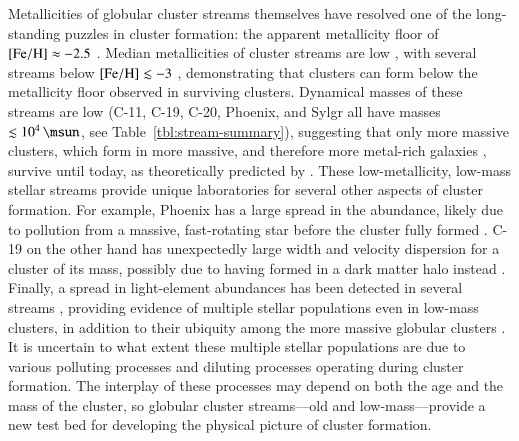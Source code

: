 \documentclass[final,5p,times,twocolumn,authoryear]{elsarticle}
\begin{document}
Metallicities of globular cluster streams themselves have resolved one of the long-standing puzzles in cluster formation: the apparent metallicity floor of ${[\mathrm{Fe}/\mathrm{H}]}\approx-2.5$ \citep[e.g.,][]{harris:1996,harris:2010,beasley:2019}.
Median metallicities of cluster streams are low \citep[$\feh\lesssim-1$,][]{martin:2022b}, with several streams below ${[\mathrm{Fe}/\mathrm{H}]}\lesssim-3$ \citep{roederer:2019,wan:2020,martin:2022a}, demonstrating that clusters can form below the metallicity floor observed in surviving clusters.
Dynamical masses of these streams are low (C-11, C-19, C-20, Phoenix, and Sylgr all have masses $\lesssim10^4\,\unit{\msun}$, see Table~\ref{tbl:stream-summary}), suggesting that only more massive clusters, which form in more massive, and therefore more metal-rich galaxies \citep[e.g.,][]{maiolino:2019}, survive until today, as theoretically predicted by \citet{kruijssen:2019}.
These low-metallicity, low-mass stellar streams provide unique laboratories for several other aspects of cluster formation.
For example, Phoenix has a large spread in the  abundance, likely due to pollution from a massive, fast-rotating star before the cluster fully formed \citep{casey:2021}.
C-19 on the other hand has unexpectedly large width and velocity dispersion for a cluster of its mass, possibly due to having formed in a dark matter halo instead \citep{errani:2022}.
Finally, a spread in light-element abundances has been detected in several streams \citep{martin:2022a,balbinot:2022,usman:2024}, providing evidence of multiple stellar populations even in low-mass clusters, in addition to their ubiquity among the more massive globular clusters \citep[e.g.,][]{gratton:2012}.
It is uncertain to what extent these multiple stellar populations are due to various polluting processes \citep[e.g., massive AGB stars, fast-rotating massive stars, supermassive stars,][]{bastian:2018} and diluting processes \citep[e.g., stellar mass-loss, interactive binaries, re-accretion,][]{gratton:2019} operating during cluster formation.
The interplay of these processes may depend on both the age and the mass of the cluster, so globular cluster streams---old and low-mass---provide a new test bed for developing the physical picture of cluster formation.
\end{document}
